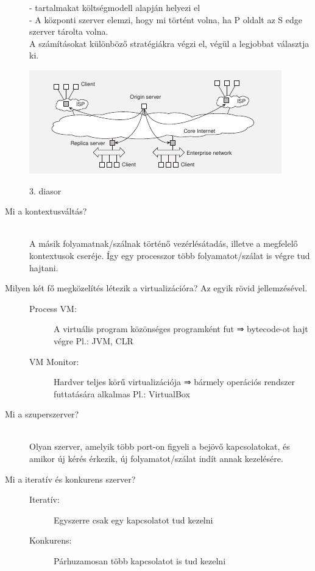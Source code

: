 \documentclass[12pt]{article}
\begin{document}
\begin{description}
        - tartalmakat költségmodell alapján helyezi el\\
        - A központi szerver elemzi, hogy mi történt volna, ha P oldalt az S edge szerver tárolta volna.\\
        A számításokat különböző stratégiákra végzi el, végül a legjobbat választja ki.\\
       \begin{center}
           \includegraphics[scale=0.9]{./images/Globule.png}
       \end{center}
    \hfill
3. diasor
    \item [Mi a kontextusváltás?]
        \hfill \\ A másik folyamatnak/szálnak történő vezérlésátadás, illetve a megfelelő kontextusok cseréje. Így egy processzor több folyamatot/szálat is végre tud hajtani.
    \item [Milyen két fő megközelítés létezik a virtualizációra? Az egyik rövid jellemzésével.]
    \begin{description}
        \item [Process VM:] A virtuális program közönséges programként fut ⇒ bytecode-ot hajt végre Pl.: JVM, CLR
        \item [VM Monitor:] Hardver teljes körű virtualizációja ⇒ bármely operációs rendszer futtatására alkalmas Pl.: VirtualBox
    \end{description}
\item [Mi a szuperszerver?]
    \hfill \\ Olyan szerver, amelyik több port-on figyeli a bejövő kapcsolatokat, és amikor új kérés érkezik, új folyamatot/szálat indít annak kezelésére.
\item [Mi a iteratív és konkurens szerver?]
    \begin{description}
        \item [Iteratív:] Egyszerre csak egy kapcsolatot tud kezelni
    \item [Konkurens:] Párhuzamosan több kapcsolatot is tud kezelni
    \end{description}

\end{description}
\end{document}
